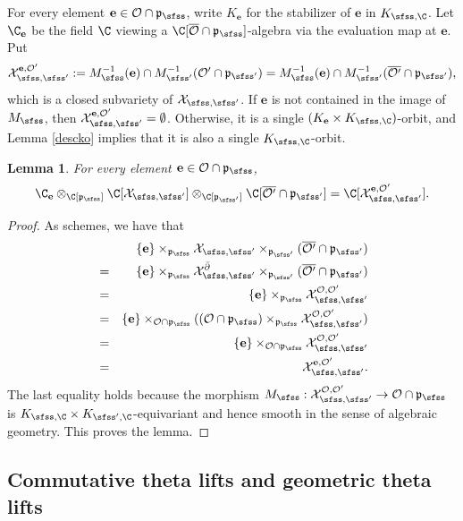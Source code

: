 \documentclass[12pt,a4paper]{amsart}
\newcommand{\CO}{{\mathcal {O}}}
\newcommand{\CX}{{\mathcal {X}}}
\newcommand{\p}{\mathfrak p}
\numberwithin{equation}{section}
\newtheorem{lem}[thm]{Lemma}
\theoremstyle{remark}
\begin{document}
For every element $\mathbf e\in \CO\cap \p_\sfss$, write $K_\mathbf e$ for the stabilizer of $\mathbf e$ in $K_{\sfss, \C}$. Let $\C_\mathbf e$ be the field $\C$ viewing a  $\C[\overline \CO\cap \p_\sfss]$-algebra via the evaluation map at $\mathbf e$. Put
\[
  \CX_{\sfss, \sfss'}^{\mathbf e, \CO'}:=M_\sfss^{-1}(\mathbf e)\cap M_{\sfss'}^{-1}(\CO'\cap\p_{\sfss'})=M_\sfss^{-1}(\mathbf e)\cap M_{\sfss'}^{-1}(\overline{\CO'}\cap\p_{\sfss'}),
\]
which is a closed subvariety of $\CX_{\sfss, \sfss'}$. If $\mathbf e$ is not contained in the image of $M_\sfss$, then $\CX_{\sfss, \sfss'}^{\mathbf e, \CO'}=\emptyset$. Otherwise, it is a single
$(K_\mathbf e\times K_{\sfss,\C})$-orbit, and Lemma \ref{descko} implies that it is also a single $K_{\sfss,\C}$-orbit. 
\begin{lem}\label{fiber111}
For every element $\mathbf e\in \CO\cap \p_\sfss$, 
\[
  \C_\mathbf e \otimes_{\C[\p_{\sfss}]} \C[\CX_{\sfss, \sfss'}]\otimes_{\C[\p_{\sfss'}]} \C[\overline{\CO'}\cap \p_{\sfss'}]=\C[\CX_{\sfss, \sfss'}^{\mathbf e, \CO'}].
\]
\end{lem}
\begin{proof}
As schemes, we have that
\begin{eqnarray*}
  &&\{\mathbf e\}\times_{\p_\sfss}{\CX_{\sfss, \sfss'}}\times_{\p_{\sfss'}} (\overline{\CO'}\cap \p_{\sfss'})\\
  &=& \{\mathbf e\}\times_{\p_\sfss}{\CX^{\bar \partial}_{\sfss, \sfss'}}\times_{\p_{\sfss'}} (\overline{\CO'}\cap \p_{\sfss'})\\
    &=& \{\mathbf e\}\times_{\p_\sfss}   \CX_{\sfss, \sfss'}^{\CO, \CO'}\\
    &=& \{\mathbf e\} \times_{\CO\cap \p_\sfss} ( (\CO\cap \p_\sfss) \times_{\p_\sfss} \CX_{\sfss, \sfss'}^{\CO, \CO'})\\
     &=& \{\mathbf e\} \times_{\CO\cap \p_\sfss} \CX_{\sfss, \sfss'}^{\CO, \CO'}\\
   &=& \CX_{\sfss, \sfss'}^{\mathbf e, \CO'}.
\end{eqnarray*}
The last equality holds because the morphism $M_\sfss: \CX_{\sfss, \sfss'}^{\CO, \CO'}\rightarrow \CO\cap \p_\sfss$  is  $K_{\sfss, \C}\times K_{\sfss',\C}$-equivariant and hence smooth in the sense of algebraic geometry. This proves the lemma.
\end{proof}



\subsection{Commutative theta lifts and  geometric theta lifts}
\end{document}
